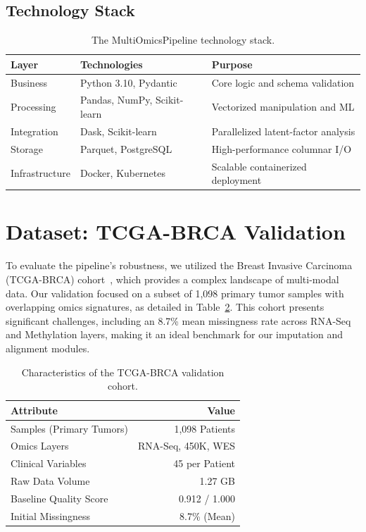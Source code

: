 \documentclass[sigconf,nonacm]{acmart}
\begin{document}
\subsection{Technology Stack}

\begin{table}[h]
\caption{The MultiOmicsPipeline technology stack.}\label{tab:stack}
\centering
\small
\renewcommand{\arraystretch}{1.2}
\begin{tabularx}{\columnwidth}{l l X}
\toprule
\rowcolor{headergray} \textbf{Layer} & \textbf{Technologies} & \textbf{Purpose} \\
\midrule
Business        & Python 3.10, Pydantic & Core logic and schema validation \\
Processing      & Pandas, NumPy, Scikit-learn & Vectorized manipulation and ML \\
Integration     & Dask, Scikit-learn    & Parallelized latent-factor analysis \\
Storage         & Parquet, PostgreSQL   & High-performance columnar I/O \\
Infrastructure  & Docker, Kubernetes    & Scalable containerized deployment \\
\bottomrule
\end{tabularx}
\end{table}

\section{Dataset: TCGA-BRCA Validation}

To evaluate the pipeline's robustness, we utilized the Breast Invasive Carcinoma (TCGA-BRCA) cohort~\cite{weinstein2013}, which provides a complex landscape of multi-modal data. Our validation focused on a subset of 1,098 primary tumor samples with overlapping omics signatures, as detailed in Table~\ref{tab:dataset}. This cohort presents significant challenges, including an 8.7\% mean missingness rate across RNA-Seq and Methylation layers, making it an ideal benchmark for our imputation and alignment modules.

\begin{table}[h]
\caption{Characteristics of the TCGA-BRCA validation cohort.}\label{tab:dataset}
\centering
\small
\renewcommand{\arraystretch}{1.2}
\begin{tabularx}{\columnwidth}{l r}
\toprule
\rowcolor{headergray} \textbf{Attribute} & \textbf{Value} \\
\midrule
Samples (Primary Tumors)    & 1,098 Patients \\
Omics Layers                & RNA-Seq, 450K, WES \\
Clinical Variables          & 45 per Patient \\
Raw Data Volume             & 1.27 GB \\
Baseline Quality Score      & 0.912 / 1.000 \\
Initial Missingness         & 8.7\% (Mean) \\
\bottomrule
\end{tabularx}
\end{table}
\end{document}

